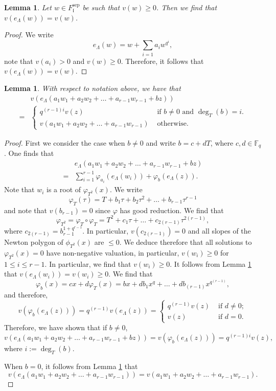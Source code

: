 \documentclass[11pt]{amsart}
\newtheorem{lemma}[theorem]{Lemma}
\newcommand{\fl}{\mathfrak{l}}
\newcommand{\F}{\mathbb{F}}
\newcommand{\op}[1]{\operatorname{#1}}
\numberwithin{equation}{section}
\begin{document}
\begin{lemma}\label{tiny lemma}
    Let $w\in F_{\fl}^{\op{sep}}$ be such that $v(w)\geq 0$. Then we find that $v(e_\Lambda(w))=v(w)$. 
\end{lemma}
\begin{proof}
    We write 
    \[e_\Lambda(w)=w+\sum_{i=1} a_i w^{q^i},\] note that $v(a_i)>0$ and $v(w)\geq 0$. Therefore, it follows that $v(e_\Lambda(w))=v(w)$.
\end{proof}

\begin{lemma}\label{v equals technical lemma}
    With respect to notation above, we have that 
    \[\begin{split} & v\left(e_\Lambda(a_1 w_1+a_2 w_2+\dots+a_{r-1} w_{r-1} +b z)\right) \\ = &\begin{cases}
        q^{(r-1)i}v(z) & \text{ if }b\neq 0\text{ and }\op{deg}_T(b)=i.\\
        v(a_1 w_1+a_2 w_2+\dots+a_{r-1} w_{r-1})& \text{ otherwise. }
    \end{cases}
    \end{split}\]
\end{lemma}
\begin{proof}
    \par First we consider the case when $b\neq 0$ and write $b=c+dT$, where $c, d\in \F_q$. One finds that 
\[\begin{split} & e_\Lambda(a_1 w_1+a_2 w_2+\dots+a_{r-1} w_{r-1} +b z) \\ 
=& \sum_{i=1}^{r-1} \varphi_{a_i} \left(e_{\Lambda}(w_i)\right)+\varphi_b \left(e_{\Lambda}(z)\right).\end{split}\]
Note that $w_i$ is a root of $\varphi_{T^2}(x)$. We write \[\varphi_T(\tau)=T+b_1 \tau+ b_2 \tau^2+\dots+ b_{r-1}\tau^{r-1}\] and note that $v(b_{r-1})=0$ since $\varphi$ has good reduction. We find that 
\[\varphi_{T^2}=\varphi_T\circ \varphi_T=T^2+c_1\tau+\dots +c_{2(r-1)}\tau^{2(r-1)},\] where $c_{2(r-1)}=b_{r-1}^{1+q^{r-1}}$. In particular, $v(c_{2(r-1)})=0$ and all slopes of the Newton polygon of $\phi_{T^2}(x)$ are $\leq 0$. We deduce therefore that all solutions to $\varphi_{T^2}(x)=0$ have non-negative valuation, in particular, $v(w_i)\geq 0$ for $1\leq i\leq r-1$. In particular, we find that $v(w_i)\geq 0$. It follows from Lemma \ref{tiny lemma} that $v(e_{\Lambda}(w_i))=v(w_i)\geq 0$. We find that
\[\varphi_b(x)=cx+d\varphi_T(x)=bx+db_1x^q+\dots +d b_{(r-1)} x^{q^{(r-1)}},\]
and therefore, 
\[v\left(\varphi_b(e_\Lambda(z))\right)=q^{(r-1)}v(e_\Lambda(z))=\begin{cases}
    q^{(r-1)}v(z) &\text{ if }d\neq 0;\\
    v(z) &\text{ if }d=0.
\end{cases}\]
Therefore, we have shown that if $b\neq 0$, 
\[v\left(e_\Lambda(a_1 w_1+a_2 w_2+\dots+a_{r-1} w_{r-1} +b z)\right)=v\left(\varphi_b(e_\Lambda(z))\right)=q^{(r-1)i}v(z),\]
where $i:=\op{deg}_T(b)$.
\par When $b=0$, it follows from Lemma \ref{tiny lemma} that 
\[v\left(e_\Lambda(a_1 w_1+a_2 w_2+\dots+a_{r-1} w_{r-1})\right)=v(a_1 w_1+a_2 w_2+\dots+a_{r-1} w_{r-1}).\]
\end{proof}
\end{document}
